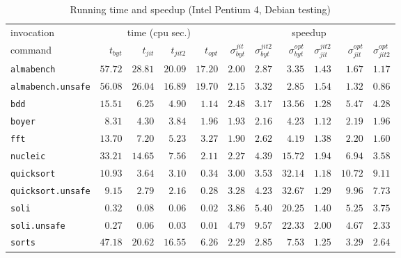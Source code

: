 \documentclass[12pt,a4paper,final]{article}
\begin{document}
\begin{table*}[h]
  \footnotesize
  \centering
  \begin{tabular}{l|rrrr|rrrrrr}
    \multicolumn{1}{l|}{\large invocation}
    & \multicolumn{4}{c|}{{\large time} (cpu sec.)}
    & \multicolumn{6}{c}{\large speedup}
    \\
    command
    & $t_{byt}$ & $t_{jit}$ & $t_{jit2}$ & $t_{opt}$
    & $\sigma^{jit}_{byt}$ & $\sigma^{jit2}_{byt}$ & $\sigma^{opt}_{byt}$
    & $\sigma^{jit2}_{jit}$ & $\sigma^{opt}_{jit}$ & $\sigma^{opt}_{jit2}$
    \\
    \hline
    \texttt{almabench} & $57.72$ & $28.81$ & $20.09$ & $17.20$ & $2.00$ & $2.87$ & $3.35$ & $1.43$ & $1.67$ & $1.17$\\
    \texttt{almabench.unsafe} & $56.08$ & $26.04$ & $16.89$ & $19.70$ & $2.15$ & $3.32$ & $2.85$ & $1.54$ & $1.32$ & $0.86$\\
    \texttt{bdd} & $15.51$ & $6.25$ & $4.90$ & $1.14$ & $2.48$ & $3.17$ & $13.56$ & $1.28$ & $5.47$ & $4.28$\\
    \texttt{boyer} & $8.31$ & $4.30$ & $3.84$ & $1.96$ & $1.93$ & $2.16$ & $4.23$ & $1.12$ & $2.19$ & $1.96$\\
    \texttt{fft} & $13.70$ & $7.20$ & $5.23$ & $3.27$ & $1.90$ & $2.62$ & $4.19$ & $1.38$ & $2.20$ & $1.60$\\
    \texttt{nucleic} & $33.21$ & $14.65$ & $7.56$ & $2.11$ & $2.27$ & $4.39$ & $15.72$ & $1.94$ & $6.94$ & $3.58$\\
    \texttt{quicksort} & $10.93$ & $3.64$ & $3.10$ & $0.34$ & $3.00$ & $3.53$ & $32.14$ & $1.18$ & $10.72$ & $9.11$\\
    \texttt{quicksort.unsafe} & $9.15$ & $2.79$ & $2.16$ & $0.28$ & $3.28$ & $4.23$ & $32.67$ & $1.29$ & $9.96$ & $7.73$\\
    \texttt{soli} & $0.32$ & $0.08$ & $0.06$ & $0.02$ & $3.86$ & $5.40$ & $20.25$ & $1.40$ & $5.25$ & $3.75$\\
    \texttt{soli.unsafe} & $0.27$ & $0.06$ & $0.03$ & $0.01$ & $4.79$ & $9.57$ & $22.33$ & $2.00$ & $4.67$ & $2.33$\\
    \texttt{sorts} & $47.18$ & $20.62$ & $16.55$ & $6.26$ & $2.29$ & $2.85$ & $7.53$ & $1.25$ & $3.29$ & $2.64$\\
  \end{tabular}
  \caption{Running time and speedup (Intel Pentium 4, Debian testing)}
  \label{table:Running_time_and_speedup_Intel_Pentium_4}
\end{table*}
\end{document}

